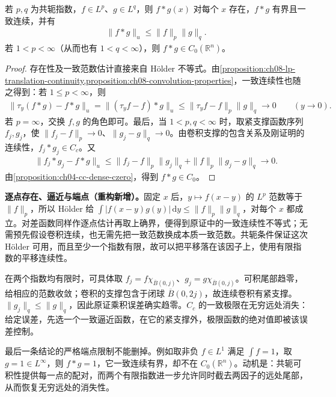\documentclass[../../main.tex]{subfiles}
\begin{document}
\begin{proposition}\label{proposition:ch08-conjugate-convolution}
若 $p,q$ 为共轭指数，$f\in L^p$、$g\in L^q$，则 $f*g(x)$ 对每个 $x$ 存在，$f*g$ 有界且一致连续，并有
\begin{align*}
\|f*g\|_u\leqslant\|f\|_p\|g\|_q.
\end{align*}
若 $1<p<\infty$（从而也有 $1<q<\infty$），则 $f*g\in C_0(\mathbb R^n)$。
\end{proposition}
\begin{proof}
存在性及一致范数估计直接来自 Hölder 不等式。由\cref{proposition:ch08-lp-translation-continuity,proposition:ch08-convolution-properties}，一致连续性也随之得到：若 $1\leqslant p<\infty$，则
\begin{align*}
\|\tau_y(f*g)-f*g\|_u
=\|(\tau_yf-f)*g\|_u
\leqslant\|\tau_yf-f\|_p\|g\|_q\longrightarrow0\qquad(y\to0).
\end{align*}
若 $p=\infty$，交换 $f,g$ 的角色即可。最后，当 $1<p,q<\infty$ 时，取紧支撑函数序列 $f_j,g_j$，使 $\|f_j-f\|_p\to0$、$\|g_j-g\|_q\to0$。由卷积支撑的包含关系及刚证明的连续性，$f_j*g_j\in C_c$。又
\begin{align*}
\|f_j*g_j-f*g\|_u
\leqslant\|f_j-f\|_p\|g_j\|_q
+\|f\|_p\|g_j-g\|_q\longrightarrow0.
\end{align*}
由\cref{proposition:ch04-cc-dense-czero}，得到 $f*g\in C_0$。
\end{proof}
\begin{remark}
\textbf{逐点存在、逼近与端点（重构新增）。}固定 $x$ 后，$y\mapsto f(x-y)$ 的 $L^p$ 范数等于 $\|f\|_p$，所以 Hölder 给 $\int|f(x-y)g(y)|\,\mathrm dy\leqslant\|f\|_p\|g\|_q$，对每个 $x$ 都成立。对差函数同样作逐点估计再取上确界，便得到原证中的一致连续性不等式；无需预先假设卷积连续，也无需先把一致范数换成本质一致范数。共轭条件保证这次 Hölder 可用，而且至少一个指数有限，故可以把平移落在该因子上，使用有限指数的平移连续性。

在两个指数均有限时，可具体取 $f_j=f\chi_{\overline B(0,j)}$、$g_j=g\chi_{\overline B(0,j)}$。可积尾部趋零，给相应的范数收敛；卷积的支撑包含于闭球 $\overline B(0,2j)$，故连续卷积有紧支撑。$\|g_j\|_q\leqslant\|g\|_q$，因此原证乘积误差确实趋零。$C_c$ 的一致极限在无穷远处消失：给定误差，先选一个一致逼近函数，在它的紧支撑外，极限函数的绝对值即被该误差控制。

最后一条结论的严格端点限制不能删掉。例如取非负 $f\in L^1$ 满足 $\int f=1$，取 $g=1\in L^\infty$，则 $f*g=1$，它一致连续有界，却不在 $C_0(\mathbb R^n)$。动机是：共轭可积性提供每一点的配对，而两个有限指数进一步允许同时截去两因子的远处尾部，从而恢复无穷远处的消失性。
\end{remark}
\end{document}
